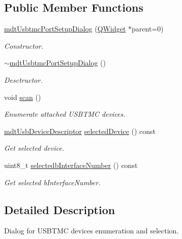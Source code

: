 \subsection*{Public Member Functions}
\begin{DoxyCompactItemize}
\item 
\hyperlink{classmdt_usbtmc_port_setup_dialog_afdfb9303c8c2a1c9da8ecb19d5c19610}{mdt\-Usbtmc\-Port\-Setup\-Dialog} (\hyperlink{class_q_widget}{Q\-Widget} $\ast$parent=0)
\begin{DoxyCompactList}\small\item\em Constructor. \end{DoxyCompactList}\item 
\hyperlink{classmdt_usbtmc_port_setup_dialog_a3bdcdf04d7a5bd602e7f7146788a47c4}{$\sim$mdt\-Usbtmc\-Port\-Setup\-Dialog} ()
\begin{DoxyCompactList}\small\item\em Desctructor. \end{DoxyCompactList}\item 
void \hyperlink{classmdt_usbtmc_port_setup_dialog_a56ee075b8717b1ea3fd37054dfdb31f7}{scan} ()
\begin{DoxyCompactList}\small\item\em Enumerate attached U\-S\-B\-T\-M\-C devices. \end{DoxyCompactList}\item 
\hyperlink{classmdt_usb_device_descriptor}{mdt\-Usb\-Device\-Descriptor} \hyperlink{classmdt_usbtmc_port_setup_dialog_ad9df953ad2fb122a170f425c233ba956}{selected\-Device} () const 
\begin{DoxyCompactList}\small\item\em Get selected device. \end{DoxyCompactList}\item 
uint8\-\_\-t \hyperlink{classmdt_usbtmc_port_setup_dialog_a0d49048eaa9fd47788178a2f9cb9feeb}{selectedb\-Interface\-Number} () const 
\begin{DoxyCompactList}\small\item\em Get selected b\-Interface\-Number. \end{DoxyCompactList}\end{DoxyCompactItemize}


\subsection{Detailed Description}
Dialog for U\-S\-B\-T\-M\-C devices enumeration and selection. 

